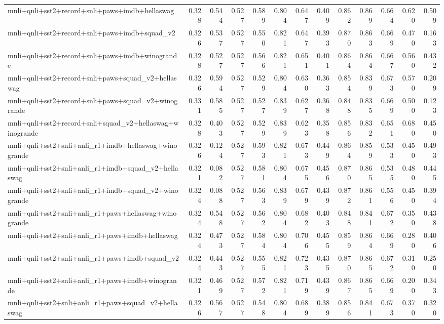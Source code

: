 \begin{table}[t]
\begin{tabular}{lrrrrrrrrrrrr}
    mnli+qnli+sst2+record+snli+paws+imdb+hellaswag & 0.328 & 0.544 & 0.527 & 0.589 & 0.804 & 0.647 & 0.409 & 0.862 & 0.869 & 0.664 & 0.620 & 0.509 \\
    mnli+qnli+sst2+record+snli+paws+imdb+squad\_v2 & 0.326 & 0.537 & 0.527 & 0.550 & 0.821 & 0.647 & 0.393 & 0.870 & 0.863 & 0.669 & 0.470 & 0.163 \\
    mnli+qnli+sst2+record+snli+paws+imdb+winogrande & 0.328 & 0.527 & 0.527 & 0.566 & 0.821 & 0.651 & 0.401 & 0.864 & 0.864 & 0.667 & 0.560 & 0.432 \\
    mnli+qnli+sst2+record+snli+paws+squad\_v2+hellaswag & 0.326 & 0.594 & 0.527 & 0.529 & 0.804 & 0.630 & 0.363 & 0.854 & 0.839 & 0.673 & 0.570 & 0.209 \\
    mnli+qnli+sst2+record+snli+paws+squad\_v2+winogrande & 0.331 & 0.585 & 0.527 & 0.527 & 0.839 & 0.627 & 0.368 & 0.848 & 0.835 & 0.669 & 0.500 & 0.123 \\
    mnli+qnli+sst2+record+snli+squad\_v2+hellaswag+winogrande & 0.328 & 0.403 & 0.527 & 0.529 & 0.839 & 0.623 & 0.358 & 0.856 & 0.832 & 0.651 & 0.680 & 0.450 \\
    mnli+qnli+sst2+snli+anli\_r1+imdb+hellaswag+winogrande & 0.326 & 0.124 & 0.527 & 0.593 & 0.821 & 0.673 & 0.449 & 0.864 & 0.859 & 0.533 & 0.450 & 0.493 \\
    mnli+qnli+sst2+snli+anli\_r1+imdb+squad\_v2+hellaswag & 0.321 & 0.082 & 0.527 & 0.581 & 0.804 & 0.675 & 0.456 & 0.870 & 0.865 & 0.535 & 0.480 & 0.445 \\
    mnli+qnli+sst2+snli+anli\_r1+imdb+squad\_v2+winogrande & 0.324 & 0.088 & 0.527 & 0.563 & 0.839 & 0.679 & 0.439 & 0.872 & 0.861 & 0.556 & 0.450 & 0.394 \\
    mnli+qnli+sst2+snli+anli\_r1+paws+hellaswag+winogrande & 0.324 & 0.548 & 0.527 & 0.562 & 0.804 & 0.682 & 0.403 & 0.848 & 0.841 & 0.672 & 0.350 & 0.438 \\
    mnli+qnli+sst2+snli+anli\_r1+paws+imdb+hellaswag & 0.324 & 0.473 & 0.527 & 0.584 & 0.804 & 0.706 & 0.455 & 0.859 & 0.864 & 0.669 & 0.280 & 0.406 \\
    mnli+qnli+sst2+snli+anli\_r1+paws+imdb+squad\_v2 & 0.324 & 0.443 & 0.527 & 0.555 & 0.821 & 0.723 & 0.435 & 0.870 & 0.865 & 0.672 & 0.310 & 0.250 \\
    mnli+qnli+sst2+snli+anli\_r1+paws+imdb+winogrande & 0.321 & 0.469 & 0.527 & 0.572 & 0.821 & 0.719 & 0.439 & 0.867 & 0.865 & 0.669 & 0.200 & 0.343 \\
    mnli+qnli+sst2+snli+anli\_r1+paws+squad\_v2+hellaswag & 0.326 & 0.567 & 0.527 & 0.548 & 0.804 & 0.689 & 0.389 & 0.856 & 0.841 & 0.673 & 0.370 & 0.320 \\

\end{tabular}
\end{table}
